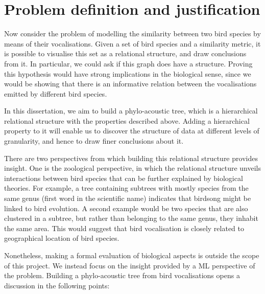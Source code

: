\documentclass[../main.tex]{subfiles}
\begin{document}
\section{Problem definition and justification}
Now consider the problem of modelling the similarity between two bird species by means of their vocalisations. Given a set of bird species and a similarity metric, it is possible to visualise this set as a relational structure, and draw conclusions from it. In particular, we could ask if this graph does have a structure. Proving this hypothesis would have strong implications in the biological sense, since we would be showing that there is an informative relation between the vocalisations emitted by different bird species.
\par In this dissertation, we aim to build a phylo-acoustic tree, which is a hierarchical relational structure with the properties described above. Adding a hierarchical property to it will enable us to discover the structure of data at different levels of granularity, and hence to draw finer conclusions about it. 
\par There are two perspectives from which building this relational structure provides insight. One is the zoological perspective, in which the relational structure unveils interactions between bird species that can be further explained by biological theories. For example, a tree containing subtrees with mostly species from the same genus (first word in the scientific name) indicates that birdsong might be linked to bird evolution. A second example would be two species that are also clustered in a subtree, but rather than belonging to the same genus, they inhabit the same area. This would suggest that bird vocalisation is closely related to geographical location of bird species.
\par Nonetheless, making a formal evaluation of biological aspects is outside the scope of this project. We instead focus on the insight provided by a ML perspective of the problem. Building a phylo-acoustic tree from bird vocalisations opens a discussion in the following points:
\end{document}
